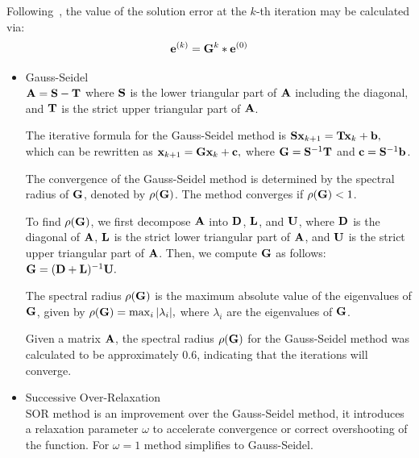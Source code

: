 Following~\cite{Zdunek}, the value of the solution error at the $k$-th iteration may be
calculated via:
\begin{equation}
  \mathbf{e}^{(k)} = \mathbf{G}^k * \mathbf{e}^{(0)}
\end{equation}

\begin{itemize}
  \item Gauss-Seidel\\
    
    $ \mathbf{A} = \mathbf{S} - \mathbf{T} $
    where $ \mathbf{S} $ is the lower triangular part of $ \mathbf{A} $ including the diagonal, and $ \mathbf{T} $ is the strict upper triangular part of $ \mathbf{A} $.

    The iterative formula for the Gauss-Seidel method is
    $ \mathbf{Sx}_{k+1} = \mathbf{Tx}_k + \mathbf{b}, $
    which can be rewritten as
    $ \mathbf{x}_{k+1} = \mathbf{Gx}_k + \mathbf{c}, $
    where $ \mathbf{G} = \mathbf{S}^{-1}\mathbf{T} $ and $ \mathbf{c} = \mathbf{S}^{-1}\mathbf{b} $.

    The convergence of the Gauss-Seidel method is determined by the spectral radius of $ \mathbf{G} $, denoted by $ \rho(\mathbf{G}) $. The method converges if $ \rho(\mathbf{G}) < 1 $.

    To find $ \rho(\mathbf{G}) $, we first decompose $ \mathbf{A} $ into $ \mathbf{D} $, $ \mathbf{L} $, and $ \mathbf{U} $, where $ \mathbf{D} $ is the diagonal of $ \mathbf{A} $, $ \mathbf{L} $ is the strict lower triangular part of $ \mathbf{A} $, and $ \mathbf{U} $ is the strict upper triangular part of $ \mathbf{A} $. Then, we compute $ \mathbf{G} $ as follows:
    $ \mathbf{G} = (\mathbf{D} + \mathbf{L})^{-1}\mathbf{U}. $

    The spectral radius $ \rho(\mathbf{G}) $ is the maximum absolute value of the eigenvalues of $ \mathbf{G} $, given by
    $ \rho(\mathbf{G}) = \max_i |\lambda_i|, $
    where $ \lambda_i $ are the eigenvalues of $ \mathbf{G} $.

    Given a matrix $ \mathbf{A} $, the spectral radius $ \rho(\mathbf{G}) $ for the Gauss-Seidel method was calculated to be approximately 0.6, indicating that the iterations will converge.
      
  \item Successive Over-Relaxation \\

    SOR method is an improvement over the Gauss-Seidel method, it introduces a relaxation parameter $ \omega $ to accelerate convergence or correct overshooting of the function.
    For $\omega = 1$ method simplifies to Gauss-Seidel.


\end{itemize}
